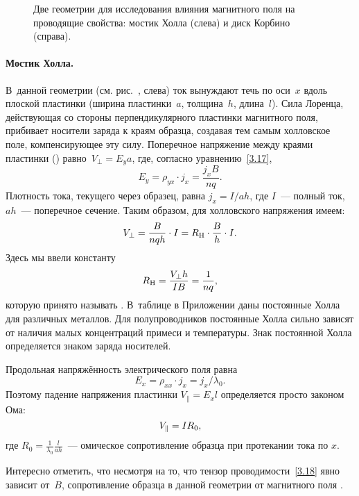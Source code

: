 \begin{figure}[h!]
\centering
    \caption{Две геометрии для исследования влияния магнитного поля на
проводящие свойства: мостик Холла (слева) и диск Корбино (справа).}
\end{figure}

\paragraph{Мостик Холла.}
В~данной геометрии (см. рис.~, слева) ток вынуждают течь по
оси~$x$ вдоль плоской пластинки (ширина пластинки~$a$, толщина~$h$,
длина~$l$).
Сила Лоренца, действующая со стороны перпендикулярного
пластинки магнитного поля, прибивает носители заряда к краям образца,
создавая тем самым холловское поле, компенсирующее эту силу.
Поперечное напряжение между краями пластинки
() равно~$V_{\perp}=E_ya$,
где, согласно уравнению~\eqref{3.17},
\[
E_y=\rho_{yx}\cdot j_x=\frac{j_x B}{nq}.
\]
Плотность тока, текущего через образец, равна $j_x=I/ah$, где $I$~---
полный ток, $ah$~--- поперечное сечение.
Таким образом, для холловского напряжения имеем:
\begin{equation}
    V_{\perp}=\frac{B}{nqh}\cdot I =R_{\rm H}\cdot \frac{B}{h}\cdot I .
    \eqmark{3.19}
\end{equation}
Здесь мы ввели константу
\begin{equation}
    R_{\rm H}= \frac{V_{\perp}h}{IB} = \frac{1}{nq},
    \eqmark{HallConstant}
\end{equation}
которую принято называть . В~таблице в Приложении даны
постоянные Холла для различных металлов. Для полупроводников постоянные Холла
сильно зависят от наличия малых концентраций примеси и температуры.
Знак постоянной Холла определяется знаком заряда носителей.

Продольная напряжённость электрического поля равна
\[E_x = \rho_{xx}\cdot j_x = j_x/\lambda_0.\]
Поэтому падение напряжения  пластинки $V_{\parallel}=E_x l$
определяется просто законом Ома:
\begin{equation}
    V_{\parallel}= I R_0,
    \eqmark{3.20}
\end{equation}
где $R_0 = \frac{1}{\lambda_0} \frac{l}{ah}$~--- омическое сопротивление
образца при протекании тока по $x$.

Интересно отметить, что несмотря на то, что тензор проводимости~\eqref{3.18}
явно зависит от~$B$, сопротивление образца в данной геометрии от магнитного поля
.

